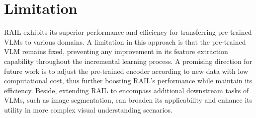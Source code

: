 \section{Limitation}
\label{app:limitation}
RAIL exhibits its superior performance and efficiency for transferring pre-trained VLMs to various domains. A limitation in this approach is that the pre-trained VLM remains fixed, preventing any improvement in its feature extraction capability throughout the incremental learning process. A promising direction for future work is to adjust the pre-trained encoder according to new data with low computational cost, thus further boosting RAIL's performance while maintain its efficiency. Beside, extending RAIL to encompass additional downstream tasks of VLMs, such as image segmentation, can broaden its applicability and enhance its utility in more complex visual understanding scenarios.